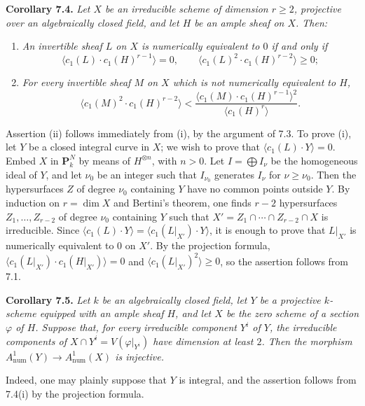 \textbf{Corollary 7.4.} \emph{Let $X$ be an irreducible scheme of
dimension $r\geq2$, projective over an algebraically closed field, and
let $H$ be an ample sheaf on $X$. Then:}
\begin{enumerate}[label=(\roman*)]
\item \emph{An invertible sheaf $L$ on $X$ is numerically equivalent to
$0$ if and only if}
\[
  \langle c_1(L)\cdot c_1(H)^{r-1}\rangle=0,
  \qquad
  \langle c_1(L)^2\cdot c_1(H)^{r-2}\rangle\geq0;
\]
\item \emph{For every invertible sheaf $M$ on $X$ which is not
numerically equivalent to $H$,}
\[
  \langle c_1(M)^2\cdot c_1(H)^{r-2}\rangle
  <\frac{\langle c_1(M)\cdot c_1(H)^{r-1}\rangle^2}
  {\langle c_1(H)^r\rangle}.
\]
\end{enumerate}

Assertion (ii) follows immediately from (i), by the argument of 7.3. To
prove (i), let $Y$ be a closed integral curve in $X$; we wish to prove
that $\langle c_1(L)\cdot Y\rangle=0$. Embed $X$ in $\mathbf P^N_k$ by
means of $H^{\otimes n}$, with $n>0$. Let $I=\bigoplus I_\nu$ be the
homogeneous ideal of $Y$, and let $\nu_0$ be an integer such that
$I_{\nu_0}$ generates $I_\nu$ for $\nu\geq\nu_0$. Then the
hypersurfaces $Z$ of degree $\nu_0$ containing $Y$ have no common points
outside $Y$. By induction on $r=\dim X$ and Bertini's theorem, one finds
$r-2$ hypersurfaces $Z_1,\ldots,Z_{r-2}$ of degree $\nu_0$ containing
$Y$ such that $X'=Z_1\cap\cdots\cap Z_{r-2}\cap X$ is irreducible.
Since $\langle c_1(L)\cdot Y\rangle
=\langle c_1(L|_{X'})\cdot Y\rangle$, it is enough to prove that
$L|_{X'}$ is numerically equivalent to $0$ on $X'$. By the projection
formula, $\langle c_1(L|_{X'})\cdot c_1(H|_{X'})\rangle=0$ and
$\langle c_1(L|_{X'})^2\rangle\geq0$, so the assertion follows from 7.1.

\textbf{Corollary 7.5.} \emph{Let $k$ be an algebraically closed field,
let $Y$ be a projective $k$-scheme equipped with an ample sheaf $H$, and
let $X$ be the zero scheme of a section $\varphi$ of $H$. Suppose that,
for every irreducible component $Y^i$ of $Y$, the irreducible components
of $X\cap Y^i=V(\varphi|_{Y^i})$
have dimension at least $2$. Then the morphism
$A^1_{\mathrm{num}}(Y)\longrightarrow A^1_{\mathrm{num}}(X)$ is
injective.}

Indeed, one may plainly suppose that $Y$ is integral, and the assertion follows from 7.4(i) by the projection formula.

